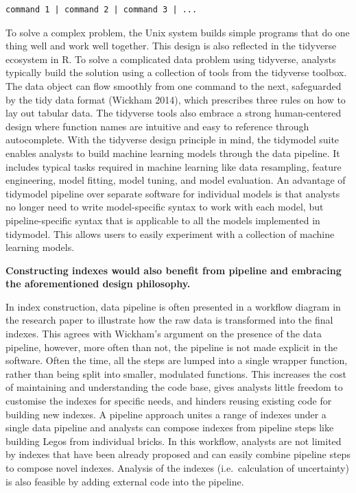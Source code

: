 \documentclass[
]{interact}
\begin{document}
\begin{verbatim}
command 1 | command 2 | command 3 | ...
\end{verbatim}

To solve a complex problem, the Unix system builds simple programs that
do one thing well and work well together. This design is also reflected
in the tidyverse ecosystem in R. To solve a complicated data problem
using tidyverse, analysts typically build the solution using a
collection of tools from the tidyverse toolbox. The data object can flow
smoothly from one command to the next, safeguarded by the tidy data
format (Wickham 2014), which prescribes three rules on how to lay out
tabular data. The tidyverse tools also embrace a strong human-centered
design where function names are intuitive and easy to reference through
autocomplete. With the tidyverse design principle in mind, the tidymodel
suite enables analysts to build machine learning models through the data
pipeline. It includes typical tasks required in machine learning like
data resampling, feature engineering, model fitting, model tuning, and
model evaluation. An advantage of tidymodel pipeline over separate
software for individual models is that analysts no longer need to write
model-specific syntax to work with each model, but pipeline-specific
syntax that is applicable to all the models implemented in tidymodel.
This allows users to easily experiment with a collection of machine
learning models.

\textbf{Constructing indexes would also benefit from pipeline and
embracing the aforementioned design philosophy.}

In index construction, data pipeline is often presented in a workflow
diagram in the research paper to illustrate how the raw data is
transformed into the final indexes. This agrees with Wickham's argument
on the presence of the data pipeline, however, more often than not, the
pipeline is not made explicit in the software. Often the time, all the
steps are lumped into a single wrapper function, rather than being split
into smaller, modulated functions. This increases the cost of
maintaining and understanding the code base, gives analysts little
freedom to customise the indexes for specific needs, and hinders reusing
existing code for building new indexes. A pipeline approach unites a
range of indexes under a single data pipeline and analysts can compose
indexes from pipeline steps like building Legos from individual bricks.
In this workflow, analysts are not limited by indexes that have been
already proposed and can easily combine pipeline steps to compose novel
indexes. Analysis of the indexes (i.e.~calculation of uncertainty) is
also feasible by adding external code into the pipeline.
\end{document}
